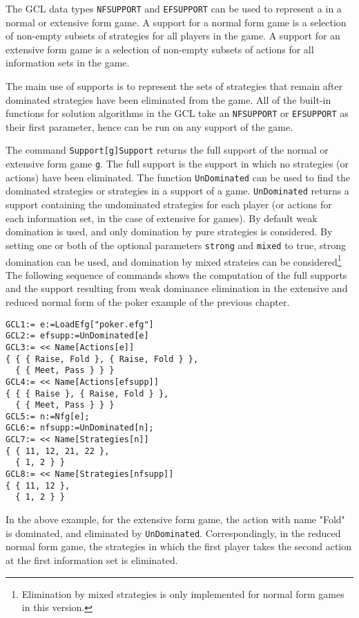 The GCL data types \verb+NFSUPPORT+ and \verb+EFSUPPORT+ can be used
to represent a  in a normal or extensive form game.  A
support for a normal form game is a selection of non-empty subsets of
strategies for all players in the game.  A support for an extensive
form game is a selection of non-empty subsets of actions for all
information sets in the game.

The main use of supports is to represent the sets of strategies that
remain after dominated strategies have been eliminated from the game.
All of the built-in functions for solution algorithms in the GCL take
an \texttt{NFSUPPORT} or \texttt{EFSUPPORT} as their first parameter,
hence can be run on any support of the game.

The command \verb+Support[g]+\texttt{Support} returns the full support
of the normal or extensive form game \verb+g+.  The full support is
the support in which no strategies (or actions) have been eliminated.
The function \texttt{UnDominated} can be used to find the dominated
strategies or strategies in a support of a game.  \texttt{UnDominated}
returns a support containing the undominated strategies for each
player (or actions for each information set, in the case of extensive
for games).  By default weak domination is used, and only domination
by pure strategies is considered. By setting one or both of the
optional parameters \verb+strong+ and \verb+mixed+ to true, strong
domination can be used, and domination by mixed strateies can be
considered\footnote{Elimination by mixed strategies is only
implemented for normal form games in this version.}  The following
sequence of commands shows the computation of the full supports and
the support resulting from weak dominance elimination in the extensive
and reduced normal form of the poker example of the previous chapter.

\begin{verbatim}
GCL1:= e:=LoadEfg["poker.efg"]
GCL2:= efsupp:=UnDominated[e]
GCL3:= << Name[Actions[e]]
{ { { Raise, Fold }, { Raise, Fold } },
  { { Meet, Pass } } }
GCL4:= << Name[Actions[efsupp]]
{ { { Raise }, { Raise, Fold } },
  { { Meet, Pass } } }
GCL5:= n:=Nfg[e];
GCL6:= nfsupp:=UnDominated[n];
GCL7:= << Name[Strategies[n]]
{ { 11, 12, 21, 22 },
  { 1, 2 } }
GCL8:= << Name[Strategies[nfsupp]]
{ { 11, 12 },
  { 1, 2 } }
\end{verbatim}

In the above example, for the extensive form game, the action with
name "Fold" is dominated, and eliminated by \verb+UnDominated+.
Correspondingly, in the reduced normal form game, the strategies in
which the first player takes the second action at the first
information set is eliminated.  

